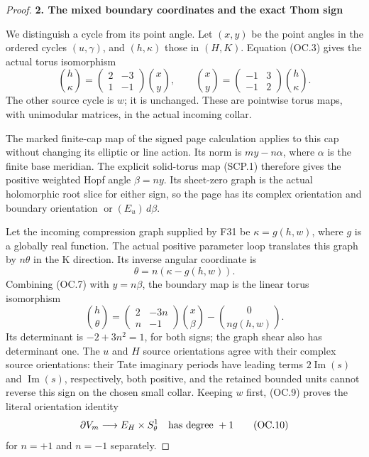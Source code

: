 \begin{proof}
\par

\medskip\noindent\textbf{2. The mixed boundary coordinates and the exact Thom sign}

\par\nobreak

We distinguish a cycle from its point angle. Let \((x,y)\) be the point
angles in the ordered cycles \((u,\gamma)\), and \((h,\kappa)\) those in
\((H,K)\). Equation (OC.3) gives the actual torus isomorphism
\[
 \binom h\kappa=
 \begin{pmatrix}2&-3\\1&-1\end{pmatrix}\binom xy,
 \qquad
 \binom xy=
 \begin{pmatrix}-1&3\\-1&2\end{pmatrix}\binom h\kappa.
 \tag{OC.7}
\]
The other source cycle is \(w\); it is unchanged. These are pointwise
torus maps, with unimodular matrices, in the actual incoming collar.

The marked finite-cap map of the signed page calculation applies to
this cap without changing its elliptic or line action. Its norm is
\(m y-n \alpha\), where \(\alpha\) is the finite base meridian. The explicit
solid-torus map (SCP.1) therefore gives the positive weighted Hopf
angle \(\beta=n y\). Its sheet-zero graph is the actual holomorphic root
slice for either sign, so the page has its complex orientation and
boundary orientation \(\operatorname{or}(E_u)\,d\beta\).

Let the incoming compression graph supplied by F31 be
\(\kappa=g(h,w)\), where \(g\) is a globally real function. The actual positive
parameter loop translates this graph by \(n \theta\) in the K direction.
Its inverse angular coordinate is
\[
 \theta=n(\kappa-g(h,w)).
 \tag{OC.8}
\]
Combining (OC.7) with \(y=n \beta\), the boundary map is the linear torus
isomorphism
\[
 \binom h\theta=
 \begin{pmatrix}2&-3n\\ n&-1\end{pmatrix}\binom x\beta
                  -\binom0{n g(h,w)}.
 \tag{OC.9}
\]
Its determinant is \(-2+3n^2=1\), for both signs; the graph shear also
has determinant one. The \(u\) and \(H\) source orientations agree with
their complex source orientations: their Tate imaginary periods have
leading terms \(2 \operatorname{Im}(s)\) and \(\operatorname{Im}(s)\), respectively, both positive, and
the retained bounded units cannot reverse this sign on the chosen
small collar. Keeping \(w\) first, (OC.9) proves the literal orientation
identity
\[
 \partial V_m\longrightarrow E_H\times S^1_\theta
                  \quad\hbox{has degree }+1
 \tag{OC.10}
\]
for \(n=+1\) and \(n=-1\) separately.


\end{proof}
